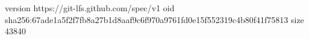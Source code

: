 version https://git-lfs.github.com/spec/v1
oid sha256:67ade1a5f2f7fb8a27b1d8aaf9c6f970a9761fd0e15f552319c4b80f41f75813
size 43840
